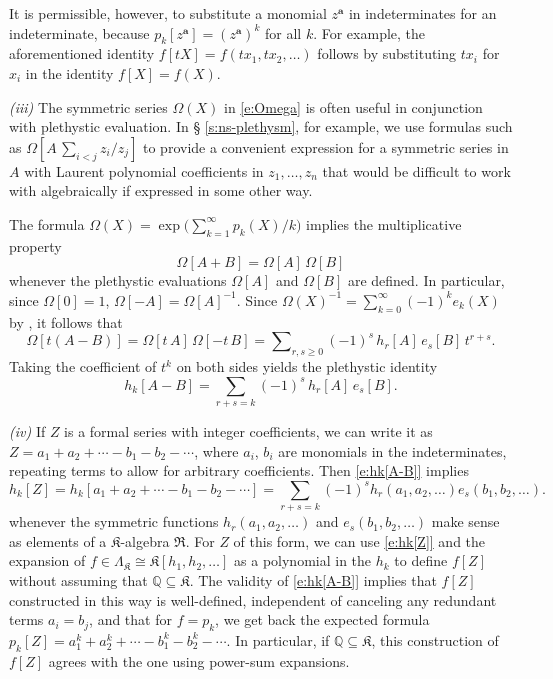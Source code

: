 \documentclass[12pt]{amsart}
\theoremstyle{definition}
\theoremstyle{remark}
\newcommand{\QQ}{{\mathbb Q}}
\newcommand{\aA}{{\mathbf a}}
\newcommand{\Kfrak}{{\mathfrak K}}
\newcommand{\Rfrak}{{\mathfrak R}}
\begin{document}
It is permissible, however, to substitute a monomial $z^{\aA }$ in
indeterminates for an indeterminate, because $p_{k}[z^{\aA }] =
(z^{\aA })^{k}$ for all $k$.  For example, the aforementioned identity
$f[tX] = f(t x_{1}, t x_{2}, \ldots )$ follows by substituting $t
x_{i}$ for $x_{i}$ in the identity $f[X] = f(X)$.

{\it (iii) } The symmetric series $\Omega (X)$ in \eqref{e:Omega} is
often useful in conjunction with plethystic evaluation.  In \S
\ref{s:ns-plethysm}, for example, we use formulas such as $\Omega [A\,
\sum _{i<j} z_{i}/z_{j}]$ to provide a convenient expression for a
symmetric series in $A$ with Laurent polynomial coefficients in
$z_{1},\ldots,z_{n}$ that would be difficult to work with
algebraically if expressed in some other way.

The formula $\Omega (X) = \exp \bigl( \sum _{k=1}^{\infty } p_{k}(X)/k
\bigr)$ implies the multiplicative property
\begin{equation}\label{e:Omega[A+B]}
\Omega [A+B] = \Omega [A]\, \Omega [B]
\end{equation}
whenever the plethystic evaluations $\Omega [A]$ and $\Omega [B]$ are
defined.  In particular, since $\Omega [0] = 1$, $\Omega [-A] = \Omega
[A]^{-1}$.  Since $\Omega (X)^{-1} = \sum _{k=0}^{\infty }(-1)^{k}
e_{k}(X)$ by \cite[(2.6)]{Macdonald95}, it follows that
\begin{equation}\label{e:Om[t(X-Y)]}
\Omega [t (A-B)] = \Omega [t\, A]\, \Omega [-t\, B] = \sum \nolimits
_{r,s\geq 0} (-1)^{s}\, h_{r}[A]\, e_{s}[B]\, t^{r+s}.
\end{equation}
Taking the coefficient of $t^{k}$ on both sides yields the plethystic
identity
\begin{equation}\label{e:hk[A-B]}
h_{k}[A-B] = \sum _{r+s=k} (-1)^{s}\, h_{r}[A]\, e_{s}[B].
\end{equation}

{\it (iv) } If $Z$ is a formal series with integer coefficients, we
can write it as $Z = a_{1}+a_{2}+\cdots -b_{1}-b_{2}-\cdots $, where
$a_{i}$, $b_{i}$ are monomials in the indeterminates, repeating terms
to allow for arbitrary coefficients.  Then \eqref{e:hk[A-B]} implies
\begin{equation}\label{e:hk[Z]}
h_{k}[Z] = h_{k}[a_{1}+a_{2}+\cdots -b_{1}-b_{2}-\cdots] = \sum _{r+s
= k} (-1)^{s} h_{r}(a_{1}, a_{2}, \ldots ) e_{s}(b_{1}, b_{2}, \ldots).
\end{equation}
whenever the symmetric functions $h_{r}(a_{1}, a_{2}, \ldots )$ and
$e_{s}(b_{1}, b_{2}, \ldots)$ make sense as elements of a $\Kfrak
$-algebra $\Rfrak $.  For $Z$ of this form, we can use \eqref{e:hk[Z]}
and the expansion of $f\in \Lambda _{\Kfrak }\cong \Kfrak [h_{1},
h_{2}, \ldots]$ as a polynomial in the $h_{k}$ to define $f[Z]$
without assuming that $\QQ \subseteq \Kfrak $.  The validity of
\eqref{e:hk[A-B]} implies that $f[Z]$ constructed in this way is
well-defined, independent of canceling any redundant terms $a_{i} =
b_{j}$, and that for $f = p_{k}$, we get back the expected formula
$p_{k}[Z] = a_{1}^{k}+a_{2}^{k}+\cdots -b_{1}^{k}-b_{2}^{k}-\cdots $.
In particular, if $\QQ \subseteq \Kfrak $, this construction of $f[Z]$
agrees with the one using power-sum expansions.
\end{document}
